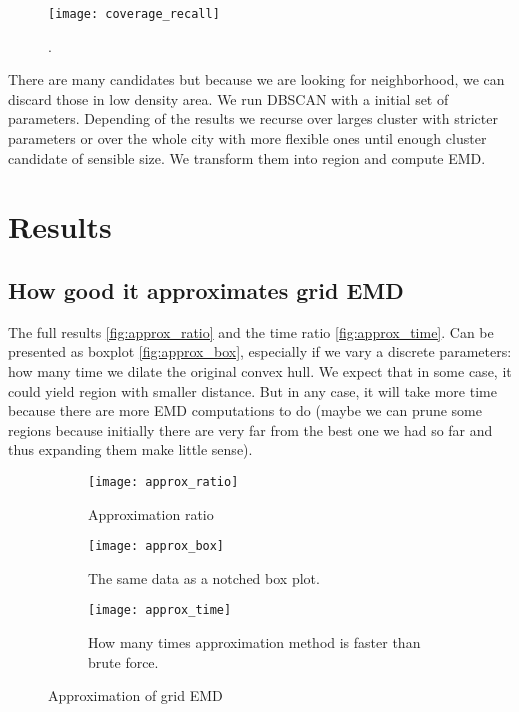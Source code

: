 \begin{figure}[tb]
    \centering
    \texttt{[image: coverage\_recall]}
    \caption{.}
    \label{fig:coverage_recall}
\end{figure}

There are many candidates but because we are looking for neighborhood, we can discard those in low density area. We run DBSCAN with a initial set of parameters. Depending of the results we recurse over larges cluster with stricter parameters or over the whole city with more flexible ones until enough cluster candidate of sensible size. We transform them into region and compute EMD.

\section{Results}
\subsection{How good it approximates grid EMD}

The full results \autoref{fig:approx_ratio} and the time ratio \autoref{fig:approx_time}. Can be presented as boxplot \autoref{fig:approx_box}, especially if we vary a discrete parameters: how many time we dilate the original convex hull. We expect that in some case, it could yield region with smaller distance. But in any case, it will take more time because there are more EMD computations to do (maybe we can prune some regions because initially there are very far from the best one we had so far and thus expanding them make little sense).

\begin{figure}[h]
    \begin{subfigure}[b]{\textwidth}
        \centering
        \texttt{[image: approx\_ratio]}
        \caption{Approximation ratio}
        \label{fig:approx_ratio}
    \end{subfigure}

    \begin{subfigure}[b]{\textwidth}
        \centering
        \texttt{[image: approx\_box]}
        \caption{The same data as a notched box plot.}
        \label{fig:approx_box}
    \end{subfigure}

    \begin{subfigure}[b]{\textwidth}
        \centering
        \texttt{[image: approx\_time]}
        \caption{How many times approximation method is faster than brute force.}
        \label{fig:approx_time}
    \end{subfigure}
    \caption{Approximation of grid EMD}
\end{figure}

